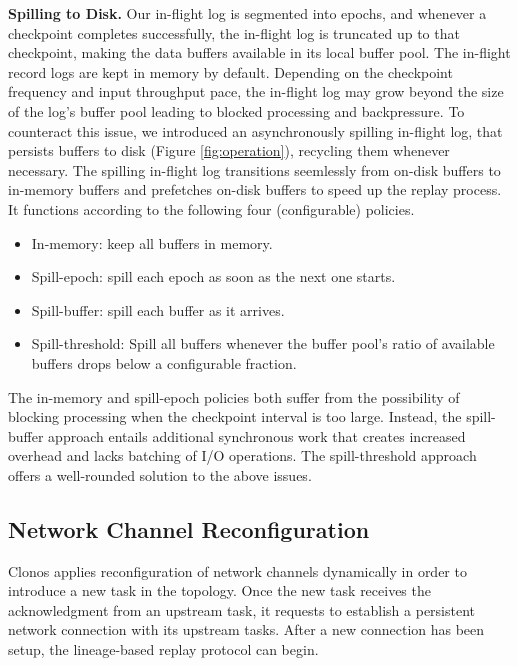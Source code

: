 \documentclass[sigconf]{acmart}
\newcommand{\para}[1]{\vspace{1mm}\noindent\textbf{#1.}}
\begin{document}
\para{Spilling to Disk} Our in-flight log is segmented into epochs, and whenever a checkpoint completes successfully, the in-flight log is truncated up to that checkpoint, making the data buffers available in its local buffer pool. 
The in-flight record logs are kept in memory by default.
Depending on the checkpoint frequency  and input throughput pace, the in-flight log may grow beyond the size of the log's buffer pool leading to blocked processing and backpressure.
To counteract this issue, we introduced an asynchronously spilling in-flight log, that persists buffers to disk (Figure \ref{fig:operation}), recycling them whenever necessary.
The spilling in-flight log transitions seemlessly from on-disk buffers to in-memory buffers and prefetches on-disk buffers to speed up the replay process. It functions according to the following four (configurable) policies.

\begin{itemize}
    \item In-memory: keep all buffers in memory.
    \item Spill-epoch: spill each epoch as soon as the next one starts.
    \item Spill-buffer: spill each buffer as it arrives.
    \item Spill-threshold: Spill all buffers whenever the buffer pool's ratio of available buffers drops below a configurable fraction.
\end{itemize}

The in-memory and spill-epoch policies both suffer from the possibility of blocking processing when the checkpoint interval is too large.
Instead, the spill-buffer approach entails additional synchronous work that creates increased overhead and lacks batching of I/O operations.
The spill-threshold approach offers a well-rounded solution to the above issues.



\subsection{Network Channel Reconfiguration}

Clonos applies reconfiguration of network channels dynamically in order to introduce a new task in the topology.
Once the new task receives the acknowledgment from an upstream task, it requests to establish a persistent network connection with its upstream tasks.
After a new connection has been setup, the lineage-based replay protocol can begin.
\end{document}
